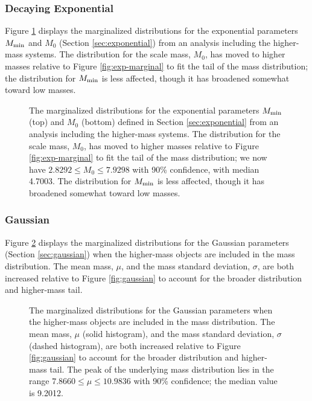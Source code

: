 \documentclass[preprint]{aastex}
\newcommand{\Mmin}{M_{\textnormal{min}}}
\begin{document}
\subsubsection{Decaying Exponential}

Figure \ref{fig:exp-cutoff-high} displays the marginalized
distributions for the exponential parameters $\Mmin$ and $M_0$
(Section \ref{sec:exponential}) from an analysis including the
higher-mass systems.  The distribution for the scale mass, $M_0$, has
moved to higher masses relative to Figure \ref{fig:exp-marginal} to
fit the tail of the mass distribution; the distribution for $\Mmin$ is
less affected, though it has broadened somewhat toward low masses.

\begin{figure}
  \begin{center}
  \end{center}
  \caption{\label{fig:exp-cutoff-high} The marginalized distributions
    for the exponential parameters $\Mmin$ (top) and $M_0$ (bottom)
    defined in Section \ref{sec:exponential} from an analysis
    including the higher-mass systems.  The distribution for the scale
    mass, $M_0$, has moved to higher masses relative to Figure
    \ref{fig:exp-marginal} to fit the tail of the mass distribution;
    we now have $2.8292 \leq M_0 \leq 7.9298$ with 90\% confidence,
    with median 4.7003.  The distribution for $\Mmin$ is less
    affected, though it has broadened somewhat toward low masses.}
\end{figure}

\subsubsection{Gaussian}

Figure \ref{fig:gaussian-high} displays the marginalized distributions
for the Gaussian parameters (Section \ref{sec:gaussian}) when the
higher-mass objects are included in the mass distribution.  The mean
mass, $\mu$, and the mass standard deviation, $\sigma$, are both
increased relative to Figure \ref{fig:gaussian} to account for the
broader distribution and higher-mass tail.

\begin{figure}
  \begin{center}
  \end{center}
  \caption{\label{fig:gaussian-high} The marginalized distributions
    for the Gaussian parameters when the higher-mass objects are
    included in the mass distribution.  The mean mass, $\mu$ (solid
    histogram), and the mass standard deviation, $\sigma$ (dashed
    histogram), are both increased relative to Figure
    \ref{fig:gaussian} to account for the broader distribution and
    higher-mass tail.  The peak of the underlying mass distribution
    lies in the range $7.8660 \leq \mu \leq 10.9836$ with 90\%
    confidence; the median value is 9.2012.}
\end{figure}
\end{document}

